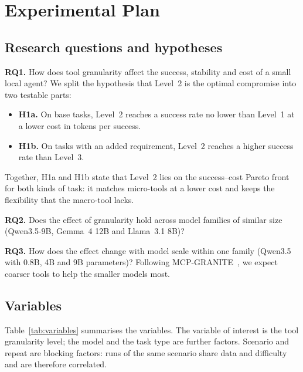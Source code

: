 \section{Experimental Plan}
\label{sec:plan}

\subsection{Research questions and hypotheses}
\label{sec:hypotheses}

\textbf{RQ1.} How does tool granularity affect the success, stability and cost of a small local agent? We split the hypothesis that Level~2 is the optimal compromise into two testable parts:
\begin{itemize}
  \item \textbf{H1a.} On base tasks, Level~2 reaches a success rate no lower than Level~1 at a lower cost in tokens per success.
  \item \textbf{H1b.} On tasks with an added requirement, Level~2 reaches a higher success rate than Level~3.
\end{itemize}
Together, H1a and H1b state that Level~2 lies on the success--cost Pareto front for both kinds of task: it matches micro-tools at a lower cost and keeps the flexibility that the macro-tool lacks.

\textbf{RQ2.} Does the effect of granularity hold across model families of similar size (Qwen3.5-9B, Gemma~4 12B and Llama~3.1 8B)?

\textbf{RQ3.} How does the effect change with model scale within one family (Qwen3.5 with 0.8B, 4B and 9B parameters)? Following MCP-GRANITE~\citep{paschalides2026granite}, we expect coarser tools to help the smaller models most.

\subsection{Variables}
\label{sec:variables}

Table~\ref{tab:variables} summarises the variables. The variable of interest is the tool granularity level; the model and the task type are further factors. Scenario and repeat are blocking factors: runs of the same scenario share data and difficulty and are therefore correlated.

